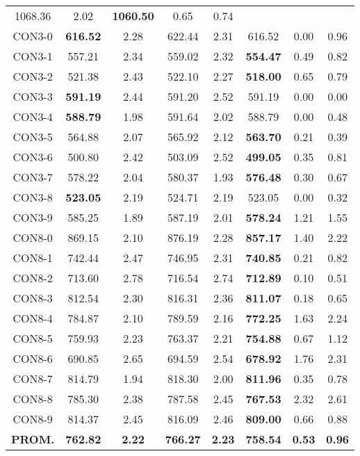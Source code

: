 \begin{table}[h]
\begin{tabular}{c c c c c c c c}
1068.36 & 2.02 & \bf{1060.50} & 
0.65 & 0.74\\CON3-0 & \bf{616.52} & 2.28 & 
622.44 & 2.31 & 616.52 & 0.00
 & 0.96\\CON3-1 & 557.21 & 2.34 & 
559.02 & 2.32 & \bf{554.47} & 
0.49 & 0.82\\CON3-2 & 521.38 & 2.43 & 
522.10 & 2.27 & \bf{518.00} & 
0.65 & 0.79\\CON3-3 & \bf{591.19} & 2.44 & 
591.20 & 2.52 & 591.19 & 0.00
 & 0.00\\CON3-4 & \bf{588.79} & 1.98 & 
591.64 & 2.02 & 588.79 & 0.00
 & 0.48\\CON3-5 & 564.88 & 2.07 & 
565.92 & 2.12 & \bf{563.70} & 
0.21 & 0.39\\CON3-6 & 500.80 & 2.42 & 
503.09 & 2.52 & \bf{499.05} & 
0.35 & 0.81\\CON3-7 & 578.22 & 2.04 & 
580.37 & 1.93 & \bf{576.48} & 
0.30 & 0.67\\CON3-8 & \bf{523.05} & 2.19 & 
524.71 & 2.19 & 523.05 & 0.00
 & 0.32\\CON3-9 & 585.25 & 1.89 & 
587.19 & 2.01 & \bf{578.24} & 
1.21 & 1.55\\CON8-0 & 869.15 & 2.10 & 
876.19 & 2.28 & \bf{857.17} & 
1.40 & 2.22\\CON8-1 & 742.44 & 2.47 & 
746.95 & 2.31 & \bf{740.85} & 
0.21 & 0.82\\CON8-2 & 713.60 & 2.78 & 
716.54 & 2.74 & \bf{712.89} & 
0.10 & 0.51\\CON8-3 & 812.54 & 2.30 & 
816.31 & 2.36 & \bf{811.07} & 
0.18 & 0.65\\CON8-4 & 784.87 & 2.10 & 
789.59 & 2.16 & \bf{772.25} & 
1.63 & 2.24\\CON8-5 & 759.93 & 2.23 & 
763.37 & 2.21 & \bf{754.88} & 
0.67 & 1.12\\CON8-6 & 690.85 & 2.65 & 
694.59 & 2.54 & \bf{678.92} & 
1.76 & 2.31\\CON8-7 & 814.79 & 1.94 & 
818.30 & 2.00 & \bf{811.96} & 
0.35 & 0.78\\CON8-8 & 785.30 & 2.38 & 
787.58 & 2.45 & \bf{767.53} & 
2.32 & 2.61\\CON8-9 & 814.37 & 2.45 & 
816.09 & 2.46 & \bf{809.00} & 
0.66 & 0.88\\\bf{PROM.} & 
\bf{762.82} & \bf{2.22} & \bf{766.27} & \bf{2.23} & \bf{758.54} & \bf{0.53} & \bf{0.96}\\[1ex]\hline
\end{tabular}
\label{table:nonlin}
\end{table}
